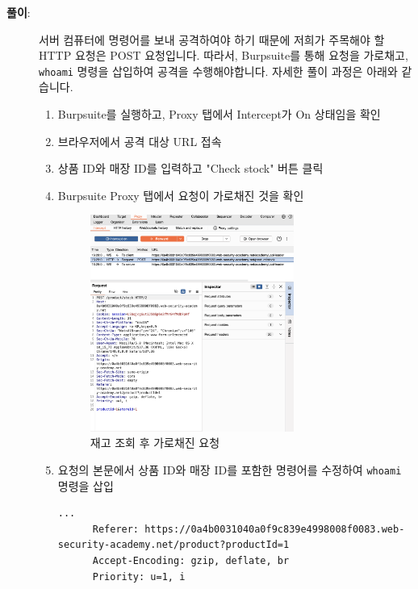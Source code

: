 \documentclass{article}
\begin{document}
\begin{description}
    \item[\textbf{풀이}:] \leavevmode\par
    서버 컴퓨터에 명령어를 보내 공격하여야 하기 때문에 저희가 주목해야 할 HTTP 요청은 POST 요청입니다.
    따라서, Burpsuite를 통해 요청을 가로채고, \texttt{whoami} 명령을 삽입하여 공격을 수행해야합니다.
    자세한 풀이 과정은 아래와 같습니다.
    \begin{enumerate}
      \item Burpsuite를 실행하고, Proxy 탭에서 Intercept가 On 상태임을 확인
      \item 브라우저에서 공격 대상 URL 접속
      \item 상품 ID와 매장 ID를 입력하고 "Check stock" 버튼 클릭
      \item Burpsuite Proxy 탭에서 요청이 가로채진 것을 확인
      
      \begin{figure}[htbp]
      \centering
      \includegraphics[width=0.7\textwidth]{../figure/figure1.png}
      \caption{재고 조회 후 가로채진 요청}
      \label{fig:stock-checker}
      \end{figure}

      \item 요청의 본문에서 상품 ID와 매장 ID를 포함한 명령어를 수정하여 \texttt{whoami} 명령을 삽입
      
      \begin{lstlisting}[label={lst:original-request},caption={원본 요청 (original request)}]
      ...
      Referer: https://0a4b0031040a0f9c839e4998008f0083.web-security-academy.net/product?productId=1
      Accept-Encoding: gzip, deflate, br
      Priority: u=1, i


\end{lstlisting}
\end{enumerate}
\end{description}
\end{document}
